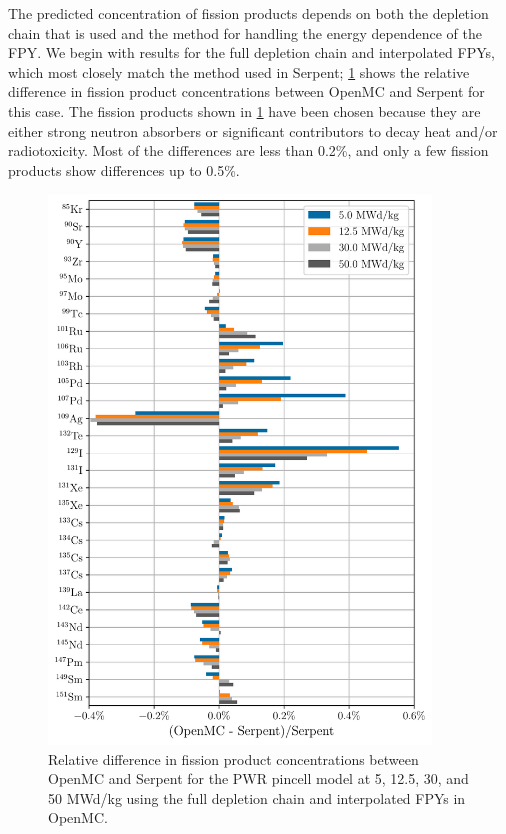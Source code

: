\documentclass[3p,authoryear]{elsarticle}
\begin{document}
The predicted concentration of fission products depends on both the depletion
chain that is used and the method for handling the energy dependence of the FPY.
We begin with results for the full depletion chain and interpolated FPYs, which
most closely match the method used in Serpent; \cref{fig:pwr-fp-full-average}
shows the relative difference in fission product concentrations between OpenMC
and Serpent for this case. The fission products shown in
\cref{fig:pwr-fp-full-average} have been chosen because they are either strong
neutron absorbers or significant contributors to decay heat and/or
radiotoxicity. Most of the differences are less than 0.2\%, and only a few
fission products show differences up to 0.5\%.
\begin{figure}[H]
  \centering
  \includegraphics[width=4in]{figures/pwr_fp_full_average.pdf}
  \caption{Relative difference in fission product concentrations between OpenMC
  and Serpent for the PWR pincell model at 5, 12.5, 30, and 50 MWd/kg using the
  full depletion chain and interpolated FPYs in OpenMC.}
  \label{fig:pwr-fp-full-average}
\end{figure}
\end{document}
